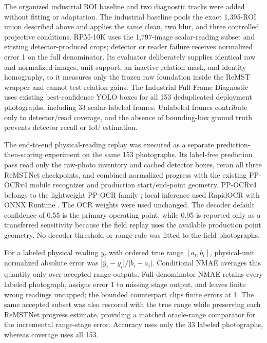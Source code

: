 \documentclass[electronics,article,submit,oneauthor]{Definitions/mdpi}
\begin{document}
The organized industrial ROI baseline and two diagnostic tracks were added without fitting or adaptation. The industrial baseline pools the exact 1,395-ROI union described above and applies the same clean, two blur, and three controlled projective conditions. RPM-10K uses the 1,797-image scalar-reading subset and existing detector-produced crops; detector or reader failure receives normalized error 1 on the full denominator. Its evaluator deliberately supplies identical raw and normalized images, unit support, an inactive relation mask, and identity homography, so it measures only the frozen raw foundation inside the ReMST wrapper and cannot test relation gains. The Industrial Full-Frame Diagnostic uses existing best-confidence YOLO boxes for all 153 deduplicated deployment photographs, including 33 scalar-labeled frames. Unlabeled frames contribute only to detector/read coverage, and the absence of bounding-box ground truth prevents detector recall or IoU estimation.

The end-to-end physical-reading replay was executed as a separate prediction-then-scoring experiment on the same 153 photographs. Its label-free prediction pass read only the raw-photo inventory and cached detector boxes, reran all three ReMSTNet checkpoints, and combined normalized progress with the existing PP-OCRv4 mobile recognizer and production start/end-point geometry. PP-OCRv4 belongs to the lightweight PP-OCR family \cite{du2020ppocr}; local inference used RapidOCR with ONNX Runtime \cite{rapidocr2026}. The OCR weights were used unchanged. The decoder default confidence of 0.55 is the primary operating point, while 0.95 is reported only as a transferred sensitivity because the field replay uses the available production point geometry. No decoder threshold or range rule was fitted to the field photographs.

For a labeled physical reading $y_i$ with ordered true range $[a_i,b_i]$, physical-unit normalized absolute error was $|\hat{y}_i-y_i|/|b_i-a_i|$. Conditional NMAE averages this quantity only over accepted range outputs. Full-denominator NMAE retains every labeled photograph, assigns error 1 to missing stage output, and leaves finite wrong readings uncapped; the bounded counterpart clips finite errors at 1. The same accepted subset was also rescored with the true range while preserving each ReMSTNet progress estimate, providing a matched oracle-range comparator for the incremental range-stage error. Accuracy uses only the 33 labeled photographs, whereas coverage uses all 153.
\end{document}
